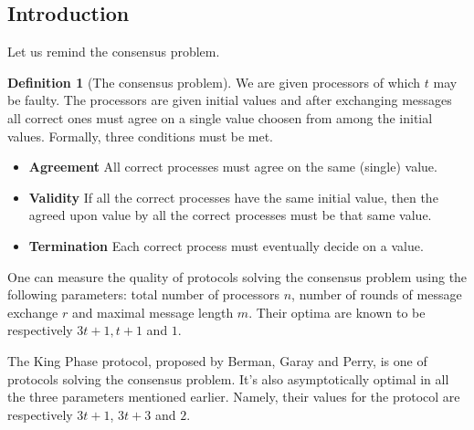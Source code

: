 \documentclass[11pt, a4paper]{report}
\begin{document}
\rhead{\today{}}

\theoremstyle{plain}
\newtheorem{thm}{Theorem} %
\newtheorem{lem}{Lemma} %
\newtheorem{exmp}{Example}%
\theoremstyle{definition}
\newtheorem{defn}{Definition} %

\subsection*{Introduction} 
Let us remind the consensus problem.
\begin{defn}[The consensus problem]
We are given processors of which $t$ may be faulty. The processors are given initial values and after exchanging messages all correct ones must agree on a single value choosen from among the initial values. Formally, three conditions must be met.
\begin{itemize}
    \item \textbf{Agreement} All correct processes must agree on the same (single) value.
    \item \textbf{Validity} If all the correct processes have the same initial value, then the agreed upon value by all the correct processes must be that same value.
    \item \textbf{Termination} Each correct process must eventually decide on a value. 
\end{itemize}
\end{defn}

One can measure the quality of protocols solving the consensus problem using the following parameters: total number of processors $n$, number of rounds of message exchange $r$ and maximal message length $m$. Their optima are known to be respectively $3t+1, t+1$ and $1$.

The King Phase protocol, proposed by Berman, Garay and Perry, is one of protocols solving the consensus problem. It's also asymptotically optimal in all the three parameters mentioned earlier. Namely, their values for the protocol are respectively $3t+1$, $3t+3$ and $2$.
\end{document}
